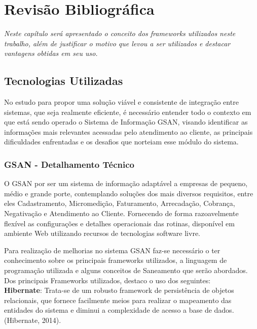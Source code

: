 \chapter[Revisão Bibliográfica]{\textbf{R}evisão \textbf{B}ibliográfica}

\textit{Neste capítulo será apresentado o conceito dos frameworks utilizados neste trabalho, além de justificar o motivo que levou a ser utilizados e destacar vantagens obtidas em seu uso.}


\section{Tecnologias Utilizadas}

No estudo para propor uma solução viável e consistente de integração entre sistemas, que seja realmente eficiente, é necessário entender todo o contexto em que está sendo operado o Sistema de Informação GSAN, visando identificar as informações mais relevantes acessadas pelo atendimento ao cliente, as principais dificuldades enfrentadas e os desafios que norteiam esse módulo do sistema. 


\subsection{GSAN - Detalhamento Técnico }

O GSAN por ser um sistema de informação adaptável a empresas de pequeno, médio e grande porte, contemplando soluções dos mais diversos requisitos, entre eles Cadastramento, Micromedição, Faturamento, Arrecadação, Cobrança, Negativação e Atendimento ao Cliente. Fornecendo de forma razoavelmente flexível as configurações e detalhes operacionais das rotinas, disponível em ambiente Web utilizando recursos de tecnologias software livre.

Para realização de melhorias no sistema GSAN faz-se necessário o ter conhecimento sobre os principais frameworks utilizados, a linguagem de programação utilizada e alguns conceitos de Saneamento que serão abordados.
Dos principais Frameworks utilizados, destaco o uso dos seguintes: \\

\textbf{Hibernate}: Trata-se de um robusto framework de persistência de objetos relacionais, que fornece facilmente meios para realizar o mapeamento das entidades do sistema e diminui a complexidade de acesso a base de dados. (Hibernate, 2014). \\

